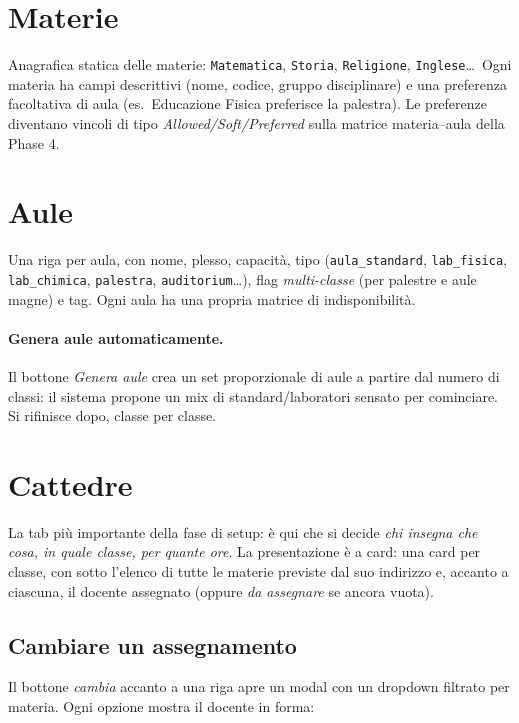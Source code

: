 \section{Materie}
\label{sec:tab_materie}

Anagrafica statica delle materie: \texttt{Matematica},
\texttt{Storia}, \texttt{Religione}, \texttt{Inglese}\dots\
Ogni materia ha campi descrittivi (nome, codice, gruppo
disciplinare) e una preferenza facoltativa di aula
(es.\ Educazione Fisica preferisce la palestra). Le preferenze
diventano vincoli di tipo \emph{Allowed/Soft/Preferred} sulla
matrice materia--aula della Phase 4.

\section{Aule}
\label{sec:tab_aule}

Una riga per aula, con nome, plesso, capacit\`a, tipo
(\texttt{aula\_standard}, \texttt{lab\_fisica},
\texttt{lab\_chimica}, \texttt{palestra}, \texttt{auditorium}\dots),
flag \emph{multi-classe} (per palestre e aule magne) e tag. Ogni
aula ha una propria matrice di indisponibilit\`a.

\paragraph{Genera aule automaticamente.} Il bottone
\emph{Genera aule} crea un set proporzionale di aule a partire
dal numero di classi: il sistema propone un mix di
standard/laboratori sensato per cominciare. Si rifinisce dopo,
classe per classe.

\section{Cattedre}
\label{sec:tab_cattedre}

La tab pi\`u importante della fase di setup: \`e qui che si
decide \emph{chi insegna che cosa, in quale classe, per quante
ore}. La presentazione \`e a card: una card per classe, con
sotto l'elenco di tutte le materie previste dal suo indirizzo e,
accanto a ciascuna, il docente assegnato (oppure \emph{da
assegnare} se ancora vuota).

\subsection{Cambiare un assegnamento}

Il bottone \emph{cambia} accanto a una riga apre un modal con un
dropdown filtrato per materia. Ogni opzione mostra il docente in
forma:


